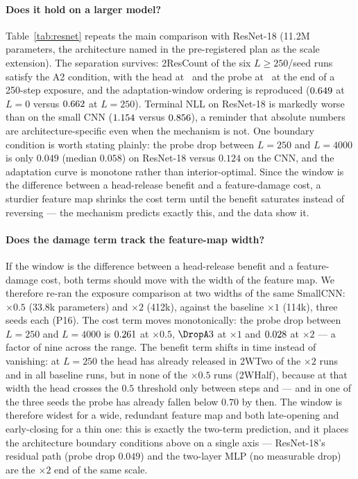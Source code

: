 \documentclass[review,12pt]{elsarticle}
\begin{document}
\paragraph{Does it hold on a larger model?}
Table~\ref{tab:resnet} repeats the main comparison with ResNet-18 (11.2M
parameters, the architecture named in the pre-registered plan as the scale
extension). The separation survives: \A2ResCount{} of the six
$L\ge250$/seed runs satisfy the A2 condition, with the head at
\HeadResLtwoF\ and the probe at \ProbeResLtwoF\ at the end of a 250-step
exposure, and the adaptation-window ordering is reproduced
($0.649$ at $L{=}0$ versus $0.662$ at $L{=}250$). Terminal NLL
on ResNet-18 is markedly worse than on the small CNN ($1.154$ versus
$0.856$), a reminder that absolute numbers are architecture-specific
even when the mechanism is not. One boundary condition is worth stating
plainly: the probe drop between $L{=}250$ and $L{=}4000$ is only $0.049$
(median $0.058$) on ResNet-18 versus $0.124$ on the CNN, and the adaptation
curve is monotone rather than interior-optimal. Since the window is the
difference between a head-release benefit and a feature-damage cost, a sturdier
feature map shrinks the cost term until the benefit saturates instead of
reversing --- the mechanism predicts exactly this, and the data show it.

\paragraph{Does the damage term track the feature-map width?}
If the window is the difference between a head-release benefit and a
feature-damage cost, both terms should move with the width of the feature map.
We therefore re-ran the exposure comparison at two widths of the same
SmallCNN: $\times0.5$ (33.8k parameters) and $\times2$ (412k), against the
baseline $\times1$ (114k), three seeds each (P16). The cost term moves
monotonically: the probe drop between $L{=}250$ and $L{=}4000$ is
$0.261$ at $\times0.5$, $\DropA3$ at $\times1$ and
$0.028$ at $\times2$ --- a factor of nine across the range. The
benefit term shifts in time instead of vanishing: at $L{=}250$ the head has
already released in \A2WTwo{} of the $\times2$ runs and in all baseline runs,
but in none of the $\times0.5$ runs (\A2WHalf), because at that width the head
crosses the $0.5$ threshold only between steps \WHalfCrossMin{} and
\WHalfCrossMax{} --- and in one of the three seeds the probe has already fallen
below $0.70$ by then. The window is therefore widest for a wide, redundant
feature map and both late-opening and early-closing for a thin one: this is
exactly the two-term prediction, and it places the architecture boundary
conditions above on a single axis --- ResNet-18's residual path (probe drop
$0.049$) and the two-layer MLP (no measurable drop) are the $\times2$ end of
the same scale.
\end{document}
